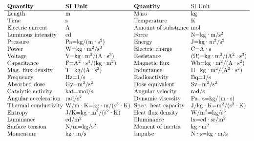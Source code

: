 { 
\[
\begin{array}{l@{\hskip 4pt}l@{\hskip 6pt}l@{\hskip 4pt}l}
\text{\textbf{Quantity}} & \text{\textbf{SI Unit}} & \text{\textbf{Quantity}} & \text{SI Unit} \\
\hline
\text{Length} & \text{m} & \text{Mass} & \text{kg} \\
\text{Time} & \text{s} & \text{Temperature} & \text{K} \\
\text{Electric current} & \text{A} & \text{Amount of substance} & \text{mol} \\
\text{Luminous intensity} & \text{cd} & \text{Force} & \text{N=kg·m/s$^2$} \\
\text{Pressure} & \text{Pa=kg/(m·s$^2$)} & \text{Energy} & \text{J=kg·m$^2$/s$^2$} \\
\text{Power} & \text{W=kg·m$^2$/s$^3$} & \text{Electric charge} & \text{C=A·s} \\
\text{Voltage} & \text{V=kg·m$^2$/(A·s$^3$)} & \text{Resistance} & \text{($\Omega$)=kg·m$^2$/(A$^2$·s$^3$)} \\
\text{Capacitance} & \text{F=A$^2$·s$^4$/(kg·m$^2$)} & \text{Magnetic flux} & \text{Wb=kg·m$^2$/(A·s$^2$)} \\
\text{Mag. flux density} & \text{T=kg/(A·s$^2$)} & \text{Inductance} & \text{H=kg·m$^2$/(A$^2$·s$^2$)} \\
\text{Frequency} & \text{Hz=1/s} & \text{Radioactivity} & \text{Bq=1/s} \\
\text{Absorbed dose} & \text{Gy=m$^2$/s$^2$} & \text{Dose equivalent} & \text{Sv=m$^2$/s$^2$} \\
\text{Catalytic activity} & \text{kat=mol/s} & \text{Angular velocity} & \text{rad/s} \\
\text{Angular acceleration} & \text{rad/s$^2$} & \text{Dynamic viscosity} & \text{Pa·s=kg/(m·s)} \\
\text{Thermal conductivity} & \text{W/m·K=kg·m/(s$^3$·K)} & \text{Spec. heat capacity} & \text{J/kg·K=m$^2$/(s$^2$·K)} \\
\text{Entropy} & \text{J/K=kg·m$^2$/(s$^2$·K)} & \text{Heat flux density} & \text{W/m$^2$=kg/s$^3$} \\
\text{Luminance} & \text{cd/m$^2$} & \text{Illuminance} & \text{lx=cd·sr/m$^2$} \\
\text{Surface tension} & \text{N/m=kg/s$^2$} & \text{Moment of inertia} & \text{kg·m$^2$} \\
\text{Momentum} & \text{kg·m/s} & \text{Impulse} & \text{N·s=kg·m/s} \\
\end{array}
\]
}